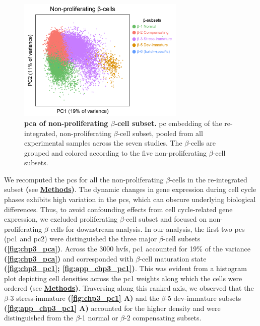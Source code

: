 \begin{figure}
\vspace{-10pt}
\includegraphics[width=8cm]{Chapter5/Fig/F3-6-01.png}
\caption[ of non-proliferating $\beta$-cell subsets]{\textbf{\gls{pca} of non-proliferating $\beta$-cell subset.} \gls{pc} embedding of the re-integrated, non-proliferating $\beta$-cell subset, pooled from all experimental samples across the seven studies. The $\beta$-cells are grouped and colored according to the five non-proliferating $\beta$-cell subsets.}
\vspace{-15pt}
\label{fig:chp3_pca}
\end{figure}

\par We recomputed the \glspl{pc} for all the non-proliferating $\beta$-cells in the re-integrated subset \textbf{(}see \hyperref[subsubsec:met_chp3_pca]{\textbf{Methods}}\textbf{)}. The dynamic changes in gene expression during cell cycle phases exhibits high variation in the \glspl{pc}, which can obscure underlying biological differences. Thus, to avoid confounding effects from cell cycle-related gene expression, we excluded proliferating $\beta$-cell subset and focused on non-proliferating $\beta$-cells for downstream analysis. In our analysis, the first two \glspl{pc} (\gls{pc}1 and \gls{pc}2) were distinguished the three major $\beta$-cell subsets \textbf{(\autoref{fig:chp3_pca})}. Across the 3000 \glspl{hvf}, \gls{pc}1 accounted for 19\% of the variance \textbf{(\autoref{fig:chp3_pca})} and corresponded with $\beta$-cell maturation state \textbf{(\autoref{fig:chp3_pc1}; \autoref{fig:app_chp3_pc1})}. This was evident from a histogram plot depicting cell densities across the \gls{pc}1 weights along which the cells were ordered \textbf{(}see \hyperref[subsubsec:met_chp3_pca]{\textbf{Methods}}\textbf{)}. Traversing along this ranked axis, we observed that the $\beta$-3 stress-immature \textbf{(\autoref{fig:chp3_pc1} A)} and the $\beta$-5 dev-immature subsets \textbf{(\autoref{fig:app_chp3_pc1} A)} accounted for the higher density and were distinguished from the $\beta$-1 normal or $\beta$-2 compensating subsets.\\


